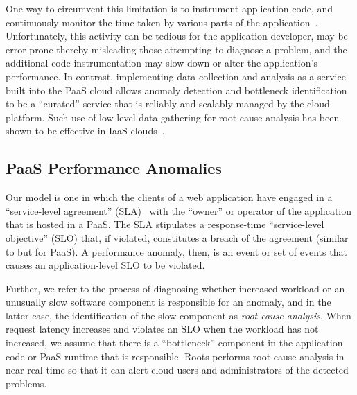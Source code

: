 One way to circumvent this 
limitation is to instrument application code, and continuously monitor the time taken by various
parts of the application~\cite{newrelic,datadog,dynatrace}. 
Unfortunately, this activity can be tedious for the application developer, 
may be error prone thereby misleading those attempting to
diagnose a problem, and
the additional code instrumentation may slow down or alter the application's
performance. 
In contrast, implementing data collection and analysis as a service built into the PaaS cloud allows 
anomaly detection and bottleneck identification to be a ``curated'' service that is 
reliably and scalably managed by the cloud platform. Such use of low-level data gathering
for root cause analysis has been shown to be effective in IaaS clouds~\cite{Dean:2014:PTR:2696535.2696551}.

\subsection{PaaS Performance Anomalies}


Our model is
one in which the clients of a web application have engaged in a
``service-level agreement'' (SLA)~\cite{Keller:2003:WFS:635430.635442}
with the ``owner'' or operator of the application that is hosted in a PaaS.  The SLA
stipulates a response-time ``service-level objective'' (SLO) that, if violated, constitutes a breach of the
agreement (similar to \cite{Nguyen:2011:PPR:2038633.2038634} but for PaaS).  
A performance anomaly, then, is an event or set of events that
causes an application-level SLO to be violated.

Further, we refer to the process
of diagnosing whether increased workload or an unusually slow software component is responsible for
an anomaly, and in the latter case, the identification of the slow component
as \textit{root cause analysis}.  When request latency increases and violates an SLO when
the workload has not increased, we assume that there is a ``bottleneck''
component in the application code or PaaS runtime that is responsible.  Roots
performs root cause analysis in near real time so
that it can alert cloud users and administrators of the detected problems.

